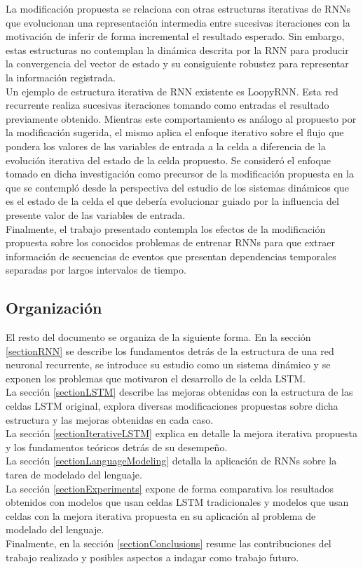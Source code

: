 \documentclass{article}
\begin{document}
	La modificación propuesta se relaciona con otras estructuras iterativas\cite{2BridgingGaps} de RNNs que evolucionan una representación intermedia entre sucesivas iteraciones con la motivación de inferir de forma incremental el resultado esperado. Sin embargo, estas estructuras no contemplan la dinámica descrita por la RNN para producir la convergencia del vector de estado y su consiguiente robustez para representar la información registrada.\\
	
	Un ejemplo de estructura iterativa de RNN existente es LoopyRNN\cite{17LoopyRNN}. Esta red recurrente realiza sucesivas iteraciones tomando como entradas el resultado previamente obtenido. Mientras este comportamiento es análogo al propuesto por la modificación sugerida, el mismo aplica el enfoque iterativo sobre el flujo que pondera los valores de las variables de entrada a la celda a diferencia de la evolución iterativa del estado de la celda propuesto. Se consideró el enfoque tomado en dicha investigación como precursor de la modificación propuesta en la que se contempló desde la perspectiva del estudio de los sistemas dinámicos que es el estado de la celda el que debería evolucionar guiado por la influencia del presente valor de las variables de entrada.\\
	Finalmente, el trabajo presentado contempla los efectos de la modificación propuesta sobre los conocidos problemas de entrenar RNNs para que extraer información de secuencias de eventos que presentan dependencias temporales separadas por largos intervalos de tiempo.
	
	\subsection{Organización}
	El resto del documento se organiza de la siguiente forma. 
	En la sección \ref{sectionRNN} se describe los fundamentos detrás de la estructura de una red neuronal recurrente, se introduce su estudio como un sistema dinámico y se exponen los problemas que motivaron el desarrollo de la celda LSTM. \\
	La sección \ref{sectionLSTM} describe las mejoras obtenidas con la estructura de las celdas LSTM original, explora diversas modificaciones propuestas sobre dicha estructura y las mejoras obtenidas en cada caso.\\
	La sección \ref{sectionIterativeLSTM} explica en detalle la mejora iterativa propuesta y los fundamentos teóricos detrás de su desempeño.\\
	La sección \ref{sectionLanguageModeling} detalla la aplicación de RNNs sobre la tarea de modelado del lenguaje.\\
	La sección \ref{sectionExperiments} expone de forma comparativa los resultados obtenidos con modelos que usan celdas LSTM tradicionales y modelos que usan celdas con la mejora iterativa propuesta en su aplicación al problema de modelado del lenguaje. \\
	Finalmente, en la sección \ref{sectionConclusions} resume las contribuciones del trabajo realizado y posibles aspectos a indagar como trabajo futuro.
	
\end{document}

